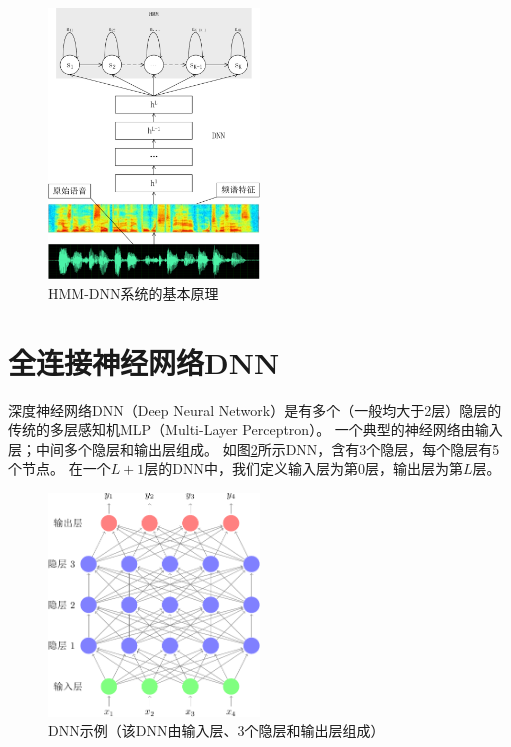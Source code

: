 \begin{figure}[htbp]
\centering
\includegraphics[width=0.5\textwidth]{figures/chapter3/hmmdnn-crop}
\caption{HMM-DNN系统的基本原理}
\label{fig:hmmdnn}
\end{figure}


\section{全连接神经网络DNN}

深度神经网络DNN（Deep Neural Network）是有多个（一般均大于2层）隐层的传统的多层感知机MLP（Multi-Layer Perceptron）。
一个典型的神经网络由输入层；中间多个隐层和输出层组成。
如图\ref{fig:dnn}所示DNN，含有3个隐层，每个隐层有5个节点。
在一个$L+1$层的DNN中，我们定义输入层为第$0$层，输出层为第$L$层。

\begin{figure}[htbp]
\centering
\includegraphics[width=0.5\textwidth]{figures/chapter3/dnn-crop}
\caption{DNN示例（该DNN由输入层、3个隐层和输出层组成）}
\label{fig:dnn}
\end{figure}

